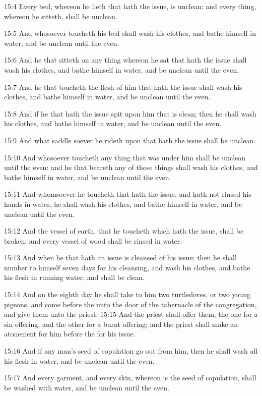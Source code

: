 15:4 Every bed, whereon he lieth that hath the issue, is unclean: and
every thing, whereon he sitteth, shall be unclean.

15:5 And whosoever toucheth his bed shall wash his clothes, and bathe
himself in water, and be unclean until the even.

15:6 And he that sitteth on any thing whereon he sat that hath the
issue shall wash his clothes, and bathe himself in water, and be
unclean until the even.

15:7 And he that toucheth the flesh of him that hath the issue shall
wash his clothes, and bathe himself in water, and be unclean until the
even.

15:8 And if he that hath the issue spit upon him that is clean; then
he shall wash his clothes, and bathe himself in water, and be unclean
until the even.

15:9 And what saddle soever he rideth upon that hath the issue shall
be unclean.

15:10 And whosoever toucheth any thing that was under him shall be
unclean until the even: and he that beareth any of those things shall
wash his clothes, and bathe himself in water, and be unclean until the
even.

15:11 And whomsoever he toucheth that hath the issue, and hath not
rinsed his hands in water, he shall wash his clothes, and bathe
himself in water, and be unclean until the even.

15:12 And the vessel of earth, that he toucheth which hath the issue,
shall be broken: and every vessel of wood shall be rinsed in water.

15:13 And when he that hath an issue is cleansed of his issue; then he
shall number to himself seven days for his cleansing, and wash his
clothes, and bathe his flesh in running water, and shall be clean.

15:14 And on the eighth day he shall take to him two turtledoves, or
two young pigeons, and come before the \LORD unto the door of the
tabernacle of the congregation, and give them unto the priest: 15:15
And the priest shall offer them, the one for a sin offering, and the
other for a burnt offering; and the priest shall make an atonement for
him before the \LORD for his issue.

15:16 And if any man's seed of copulation go out from him, then he
shall wash all his flesh in water, and be unclean until the even.

15:17 And every garment, and every skin, whereon is the seed of
copulation, shall be washed with water, and be unclean until the even.

